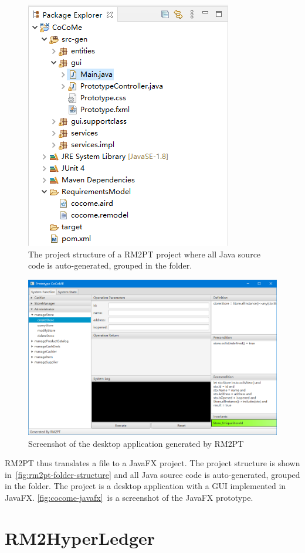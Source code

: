 \begin{figure}[ht]
\centering
\includegraphics[width=0.5\linewidth]{rm2pt-folder-structure}
\caption{The project structure of a RM2PT project where all Java source code is auto-generated, grouped in the  folder.}
\label{fig:rm2pt-folder-structure}
\end{figure}

\begin{figure}
\centering
\includegraphics[width=0.7\linewidth]{cocome-javafx}
\caption{Screenshot of the desktop application generated by RM2PT}
\label{fig:cocome-javafx}
\end{figure}


RM2PT thus translates a  file to a JavaFX project. The project structure is shown in~\autoref{fig:rm2pt-folder-structure} and all Java source code is auto-generated, grouped in the  folder.
The project is a desktop application with a GUI implemented in JavaFX. \autoref{fig:cocome-javafx}~is a screenshot of the JavaFX prototype.


\section{RM2HyperLedger}

